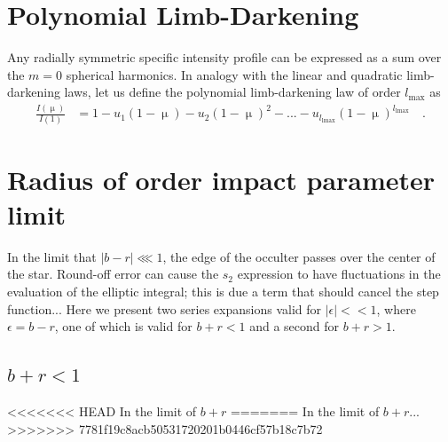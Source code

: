 \documentclass[modern]{aastex61}
\begin{document}
%
\section{Polynomial Limb-Darkening}
\label{sec:quad}

Any radially symmetric specific intensity profile can be expressed as a sum
over the $m = 0$ spherical harmonics. In analogy with the linear and quadratic
limb-darkening laws, let us define the polynomial limb-darkening law of
order $l_\mathrm{max}$ as
%
%
\begin{align}
    \label{eq:polynomialld}
    \frac{I(\upmu)}{I(1)} &= 1 - u_1 (1 - \upmu) - u_2 (1 - \upmu)^2 - ... - u_{l_\mathrm{lmax}}(1 - \upmu)^{l_\mathrm{lmax}}
    \quad.
\end{align}
%


\section{Radius of order impact parameter limit}

In the limit that $\vert b -r\vert \lll 1$, the edge of the occulter passes
over the center of the star.  Round-off error can cause the $s_2$ expression
to have fluctuations in the evaluation of the elliptic integral; this is
due a term that should cancel the step function...
Here we present two series expansions valid
for $\vert \epsilon \vert << 1$, where $\epsilon = b-r$, one of which is valid
for $b+r <1$ and a second for $b+r > 1$.

\subsection{$b+r <1$}

<<<<<<< HEAD
In the limit of $b+r$
=======
In the limit of $b+r$...
>>>>>>> 7781f19c8acb50531720201b0446cf57b18c7b72



\end{document}
